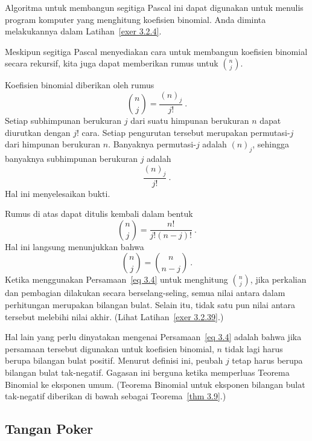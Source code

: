 Algoritma untuk membangun segitiga Pascal ini dapat digunakan untuk menulis program
komputer yang menghitung koefisien binomial.  Anda diminta melakukannya dalam
Latihan~\ref{exer 3.2.4}.
\par
Meskipun segitiga Pascal menyediakan cara untuk membangun koefisien binomial secara
rekursif, kita juga dapat memberikan rumus untuk $n \choose j$.

\begin{theorem}\label{thm 3.7}  Koefisien binomial diberikan oleh rumus
\begin{equation} {n \choose j }= \frac{(n)_j}{j!}\ .
\label{eq 3.4}  
\end{equation}                                                                        
\proof Setiap subhimpunan berukuran $j$ dari suatu himpunan berukuran $n$ dapat
diurutkan dengan $j!$ cara.  Setiap pengurutan tersebut merupakan permutasi-$j$ dari
himpunan berukuran $n$.  Banyaknya permutasi-$j$ adalah $(n)_j$, sehingga banyaknya
subhimpunan berukuran $j$ adalah
$$
\frac{(n)_j}{j!}\ .
$$ Hal ini menyelesaikan bukti.
\end{theorem}

Rumus di atas dapat ditulis kembali dalam bentuk
$${n \choose j} = \frac{n!}{j!(n-j)!}\ .$$ Hal ini langsung menunjukkan bahwa
$$ {n \choose j} = {n \choose {n-j}}\ .
$$ Ketika menggunakan Persamaan~\ref{eq 3.4} untuk menghitung ${n \choose j}$, jika
perkalian dan pembagian dilakukan secara berselang-seling, semua nilai antara dalam
perhitungan merupakan bilangan bulat.  Selain itu, tidak satu pun nilai antara tersebut
melebihi nilai akhir.  (Lihat Latihan~\ref{exer 3.2.39}.)
\par
Hal lain yang perlu dinyatakan mengenai Persamaan~\ref{eq 3.4} adalah bahwa jika
persamaan tersebut digunakan untuk  koefisien binomial, $n$ tidak
lagi harus berupa bilangan bulat positif.  Menurut definisi ini, peubah $j$ tetap harus
berupa bilangan bulat tak-negatif.  Gagasan ini berguna ketika memperluas Teorema
Binomial ke eksponen umum.  (Teorema Binomial untuk eksponen bilangan bulat tak-negatif
diberikan di bawah sebagai Teorema~\ref{thm 3.9}.)
\subsection*{Tangan Poker}

